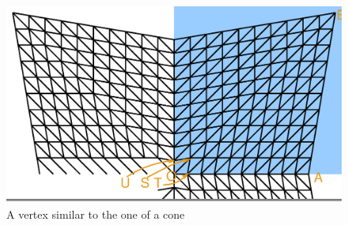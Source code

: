 \begin{figure}[ht] \centering
  \includegraphics[width=120mm]{butterfly.eps}
  \caption{A vertex similar to the one of a cone}
  \label{\numb section 7.\numb fig 8}
\end{figure}

